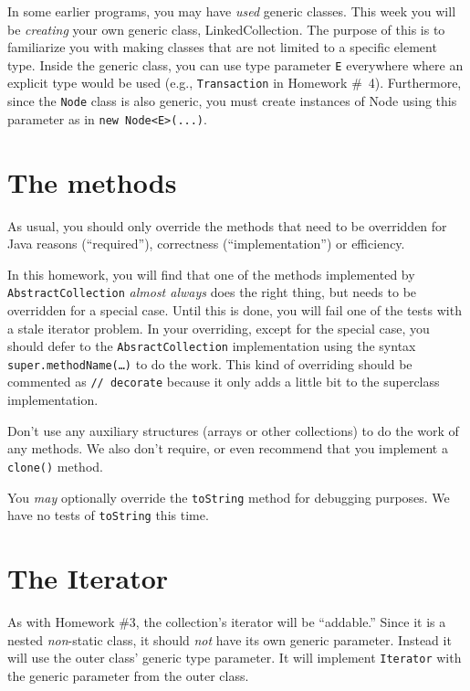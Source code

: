 \documentclass[10pt]{article}
\begin{document}
In some earlier programs, you may have \emph{used} generic classes.
This week you will be \emph{creating} your own generic class,
\textsf{LinkedCollection}.
The purpose of this is to familiarize you with making classes that
are not limited to a specific element type.  
Inside the generic class, you can use type parameter \verb|E|
everywhere where an explicit type would be used (e.g., \verb|Transaction|
in Homework \#~4).
Furthermore, since the \verb|Node| class is also generic, you must
create instances of \textsf{Node} using this parameter as in
\verb|new Node<E>(...)|.

\section{The methods}

As usual, you should only override the methods that need to be
overridden for Java reasons (``required''), correctness
(``implementation'') or efficiency.

In this homework, you will find
that one of the methods implemented by \texttt{AbstractCollection}
\emph{almost always} does the right thing, but 
needs to be overridden for a special case.  Until this is done, you will fail one of the
tests with a stale iterator problem.  In your overriding, except for
the special case, you should
defer to the \texttt{AbsractCollection} implementation using the
syntax  \texttt{super.methodName(\ldots)} to do the work.  This kind
of overriding should be commented as \texttt{// decorate} because it
only adds a little bit to the superclass implementation.

Don't use any auxiliary structures (arrays or other collections) to do
the work of any methods.  We also don't require, or even recommend that
you implement a \texttt{clone()} method.

You \emph{may} optionally override the \texttt{toString} method for
debugging purposes.  We have no tests of \texttt{toString} this time.

\section{The Iterator}

As with Homework \#3, the collection's iterator will be ``addable.''
Since it is a nested \emph{non}-static class, it should \emph{not}
have its own generic parameter.  Instead it will use the outer class'
generic type parameter.  It will implement \texttt{Iterator} with the
generic parameter from the outer class.
\end{document}
